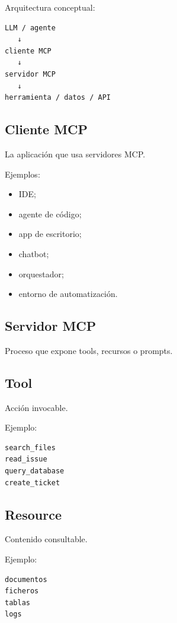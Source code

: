 Arquitectura conceptual:

\begin{lstlisting}
LLM / agente
   ↓
cliente MCP
   ↓
servidor MCP
   ↓
herramienta / datos / API
\end{lstlisting}

\subsection{Cliente MCP}\label{cliente-mcp}

La aplicación que usa servidores MCP.

Ejemplos:

\begin{itemize}
\tightlist
\item
  IDE;
\item
  agente de código;
\item
  app de escritorio;
\item
  chatbot;
\item
  orquestador;
\item
  entorno de automatización.
\end{itemize}

\subsection{Servidor MCP}\label{servidor-mcp}

Proceso que expone tools, recursos o prompts.

\subsection{Tool}\label{tool-1}

Acción invocable.

Ejemplo:

\begin{lstlisting}
search_files
read_issue
query_database
create_ticket
\end{lstlisting}

\subsection{Resource}\label{resource}

Contenido consultable.

Ejemplo:

\begin{lstlisting}
documentos
ficheros
tablas
logs
\end{lstlisting}

